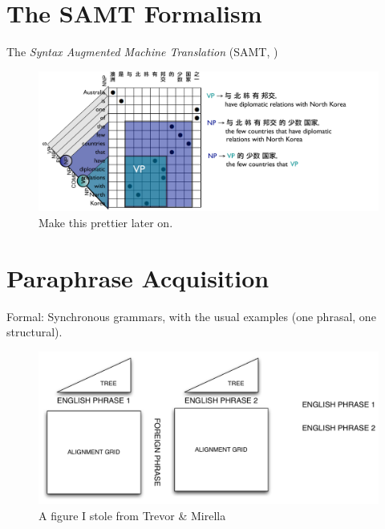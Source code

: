 \documentclass[11pt]{article}
\begin{document}
\section{The SAMT Formalism} \label{formalism}

The \emph{Syntax Augmented Machine Translation} (SAMT,
\cite{Zollmann2006})

\begin{figure}[!ht]
\begin{center}
\includegraphics[width=0.99\linewidth]{figures/scfg_grid.pdf}
\end{center}
\caption{Make this prettier later on.}
\end{figure}

\section{Paraphrase Acquisition} \label{acquisition}


Formal: Synchronous grammars, with the usual examples (one phrasal, one
structural). 

\begin{figure}[!h]
\begin{center}
\includegraphics[width=0.99\linewidth]{figures/pivot.pdf}
\end{center}
\caption{A figure I stole from Trevor \& Mirella}
\end{figure}
\end{document}
